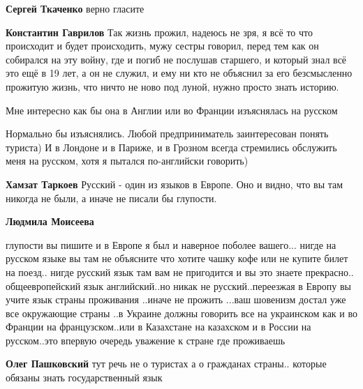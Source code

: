 \begin{itemize}
\begin{itemize}
\textbf{Сергей Ткаченко} верно гласите

\textbf{Константин Гаврилов} Так жизнь прожил, надеюсь не зря, я всё то что
происходит и будет происходить, мужу сестры говорил, перед тем как он собирался
на эту войну, где и погиб не послушав старшего, и который знал всё это ещё в 19
лет, а он не служил, и ему ни кто не объяснил за его безсмысленно прожитую
жизнь, что ничто не ново под луной, нужно просто знать историю.
\end{itemize}

Мне интересно как бы она в Англии или во Франции изъяснялась на русском

\begin{itemize}

Нормально бы изъяснялись. Любой предприниматель заинтересован понять туриста) И
в Лондоне и в Париже, и в Грозном всегда стремились обслужить меня на русском,
хотя я пытался по-английски говорить)



\textbf{Хамзат Таркоев} Русский - один из языков в Европе. Оно и видно, что вы
там никогда не были, а иначе не писали бы глупости.


\textbf{Людмила Моисеева} 

глупости вы пишите и в Европе я был и наверное поболее вашего... нигде на
русском языке вы там не объясните что хотите чашку кофе или не купите билет на
поезд.. нигде русский язык там вам не пригодится и вы это знаете прекрасно..
общеевропейский язык английский..но никак не русский..переезжая в Европу вы
учите язык страны проживания ..иначе не прожить ...ваш шовенизм достал уже все
окружающие страны ..в Украине должны говорить все на украинском как и во
Франции на французском..или в Казахстане на казахском и в России на
русском..это впервую очередь уважение к стране где проживаешь


\textbf{Олег Пашковский} тут речь не о туристах а о гражданах страны.. которые обязаны знать государственный язык


\end{itemize}
\end{itemize}
